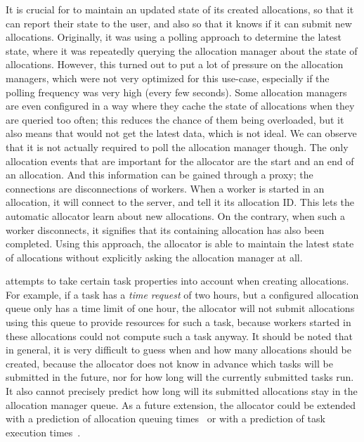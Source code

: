 It is crucial for \autoalloc{} to maintain an updated state of its created allocations,
so that it can report their state to the user, and also so that it knows if it can submit new
allocations. Originally, it was using a polling approach to determine the latest state, where it
was repeatedly querying the allocation manager about the state of allocations. However, this turned
out to put a lot of pressure on the allocation managers, which were not very optimized for this
use-case, especially if the polling frequency was very high (every few seconds). Some allocation
managers are even configured in a way where they cache the state of allocations when they are
queried too often; this reduces the chance of them being overloaded, but it also means that
\hyperqueue{} would not get the latest data, which is not ideal. We can observe that it
is not actually required to poll the allocation manager though. The only allocation events that are
important for the allocator are the start and an end of an allocation. And this information can be
gained through a proxy; the connections are disconnections of \hq{} workers. When
a worker is started in an allocation, it will connect to the server, and tell it its allocation ID.
This lets the automatic allocator learn about new allocations. On the contrary, when such a worker
disconnects, it signifies that its containing allocation has also been completed. Using this
approach, the allocator is able to maintain the latest state of allocations without explicitly
asking the allocation manager at all.

\Autoalloc{} attempts to take certain task properties into account when creating
allocations. For example, if a task has a \emph{time request} of two hours, but a configured
allocation queue only has a time limit of one hour, the allocator will not submit allocations using
this queue to provide resources for such a task, because workers started in these allocations could
not compute such a task anyway. It should be noted that in general, it is very difficult to guess
when and how many allocations should be created, because the allocator does not know in advance
which tasks will be submitted in the future, nor for how long will the currently submitted tasks
run. It also cannot precisely predict how long will its submitted allocations stay in the
allocation manager queue. As a future extension, the allocator could be extended with a prediction
of allocation queuing times~\cite{allocation-duration-prediction} or with a prediction of task execution
times~\cite{task-duration-prediction}.

